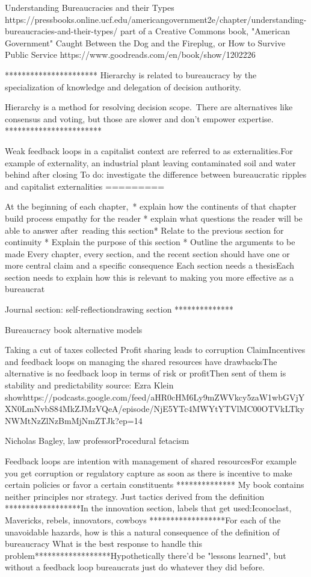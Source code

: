 Understanding Bureaucracies and their Types
https://pressbooks.online.ucf.edu/americangovernment2e/chapter/understanding-bureaucracies-and-their-types/
part of a Creative Commons book, "American Government"
Caught Between the Dog and the Fireplug, or How to Survive Public Service
https://www.goodreads.com/en/book/show/1202226

**********************
Hierarchy is related to bureaucracy by the specialization of knowledge and delegation of decision authority.

Hierarchy is a method for resolving decision scope. There are alternatives like consensus and voting, but those are slower and don't empower expertise.
***********************

Weak feedback loops in a capitalist context are referred to as externalities.For example of externality, an industrial plant leaving contaminated soil and water behind after closing
To do: investigate the difference between bureaucratic ripples and capitalist externalities
=========

At the beginning of each chapter, * explain how the continents of that chapter build process empathy for the reader
* explain what questions the reader will be able to answer after reading this section* Relate to the previous section for continuity
* Explain the purpose of this section
* Outline the arguments to be made
Every chapter, every section, and the recent section should have one or more central claim and a specific consequence
Each section needs a thesisEach section needs to explain how this is relevant to making you more effective as a bureaucrat

Journal section: self-reflectiondrawing section
**************

Bureaucracy book alternative models

Taking a cut of taxes collected
Profit sharing leads to corruption
ClaimIncentives and feedback loops on managing the shared resources have drawbacksThe alternative is no feedback loop in terms of risk or profitThen sent of them is stability and predictability
source:
Ezra Klein showhttps://podcasts.google.com/feed/aHR0cHM6Ly9mZWVkcy5zaW1wbGVjYXN0LmNvbS84MkZJMzVQeA/episode/NjE5YTc4MWYtYTVlMC00OTVkLTkyNWMtNzZlNzBmMjNmZTJk?ep=14

Nicholas Bagley, law professorProcedural fetacism

Feedback loops are intention with management of shared resourcesFor example you get corruption or regulatory capture as soon as there is incentive to make certain policies or favor a certain constituents
**************
My book contains neither principles nor strategy. Just tactics derived from the definition
******************In the innovation section, labels that get used:Iconoclast, Mavericks, rebels, innovators, cowboys
******************For each of the unavoidable hazards, how is this a natural consequence of the definition of bureaucracy
What is the best response to handle this problem******************Hypothetically there'd be "lessons learned", but without a feedback loop bureaucrats just do whatever they did before. 

